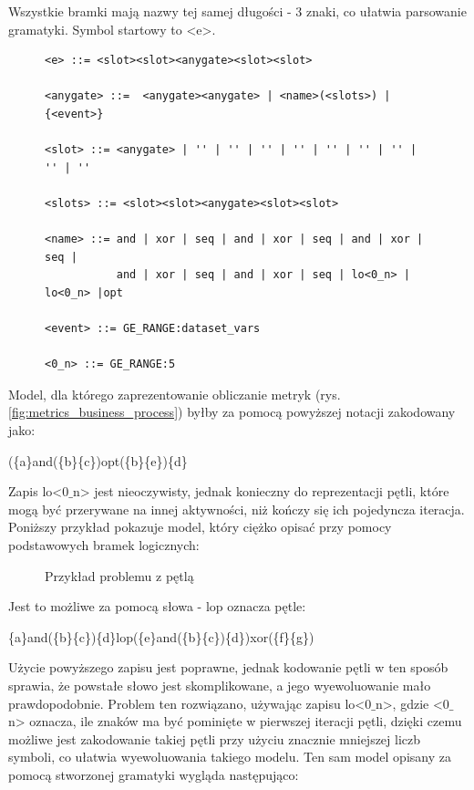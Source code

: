 Wszystkie bramki mają nazwy tej samej długości - 3 znaki, co ułatwia parsowanie gramatyki. Symbol startowy to <e>.

\begin{figure}[!ht]
\lstset{caption=Proponowana gramatyka procesu biznesowego, captionpos=b}
\lstset{label=src:grammar, frame=single}
\begin{lstlisting}
<e> ::= <slot><slot><anygate><slot><slot>

<anygate> ::=  <anygate><anygate> | <name>(<slots>) | {<event>}

<slot> ::= <anygate> | '' | '' | '' | '' | '' | '' | '' | '' | ''

<slots> ::= <slot><slot><anygate><slot><slot>

<name> ::= and | xor | seq | and | xor | seq | and | xor | seq | 
           and | xor | seq | and | xor | seq | lo<0_n> | lo<0_n> |opt

<event> ::= GE_RANGE:dataset_vars

<0_n> ::= GE_RANGE:5
\end{lstlisting}
\end{figure}

Model, dla którego zaprezentowanie obliczanie metryk (rys. \ref{fig:metrics_business_process}) byłby za pomocą powyższej notacji zakodowany jako:
\begin{center}
(\{a\}and(\{b\}\{c\})opt(\{b\}\{e\})\{d\}
\end{center}

Zapis lo<0$\_$n> jest nieoczywisty, jednak konieczny do reprezentacji pętli, które mogą być przerywane na innej aktywności, niż kończy się ich pojedyncza iteracja.  
Poniższy przykład pokazuje model, który ciężko opisać przy pomocy podstawowych bramek logicznych: 
\begin{figure}[H]
	\caption{\label{fig:subcaption_example}Przykład problemu z pętlą}
\end{figure}
\noindent Jest to możliwe za pomocą słowa - lop oznacza pętle: 
\begin{center}
\{a\}and(\{b\}\{c\})\{d\}lop(\{e\}and(\{b\}\{c\})\{d\})xor(\{f\}\{g\})
\end{center}
Użycie powyższego zapisu jest poprawne, jednak kodowanie pętli w ten sposób sprawia, że powstałe słowo jest skomplikowane, a jego wyewoluowanie mało prawdopodobnie. Problem ten rozwiązano, używając zapisu  lo<0$\_$n>, gdzie <0$\_$n> oznacza, ile znaków ma być pominięte w pierwszej iteracji pętli, dzięki czemu możliwe jest zakodowanie takiej pętli przy użyciu znacznie mniejszej liczb symboli, co ułatwia wyewoluowania takiego modelu. Ten sam model opisany za pomocą stworzonej gramatyki wygląda następująco:

